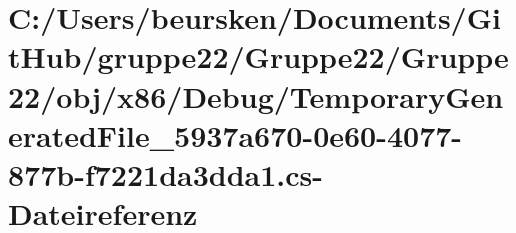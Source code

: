 \hypertarget{_gruppe22_2obj_2x86_2_debug_2_temporary_generated_file__5937a670-0e60-4077-877b-f7221da3dda1_8cs}{\section{C\-:/\-Users/beursken/\-Documents/\-Git\-Hub/gruppe22/\-Gruppe22/\-Gruppe22/obj/x86/\-Debug/\-Temporary\-Generated\-File\-\_\-5937a670-\/0e60-\/4077-\/877b-\/f7221da3dda1.cs-\/\-Dateireferenz}
\label{_gruppe22_2obj_2x86_2_debug_2_temporary_generated_file__5937a670-0e60-4077-877b-f7221da3dda1_8cs}
}
